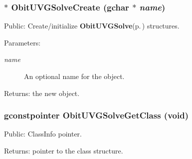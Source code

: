 \subsubsection{$\ast$ Obit\-UVGSolve\-Create (gchar $\ast$ {\em name})}\label{ObitUVGSolve_8h_a6}


Public: Create/initialize {\bf Obit\-UVGSolve}{\rm (p.\,\pageref{structObitUVGSolve})} structures. 

\begin{Desc}
\item[Parameters:]
\begin{description}
\item[{\em name}]An optional name for the object. \end{description}
\end{Desc}
\begin{Desc}
\item[Returns:]the new object. \end{Desc}
\subsubsection{\setlength{\rightskip}{0pt plus 5cm}gconstpointer Obit\-UVGSolve\-Get\-Class (void)}\label{ObitUVGSolve_8h_a7}


Public: Class\-Info pointer. 

\begin{Desc}
\item[Returns:]pointer to the class structure. \end{Desc}
